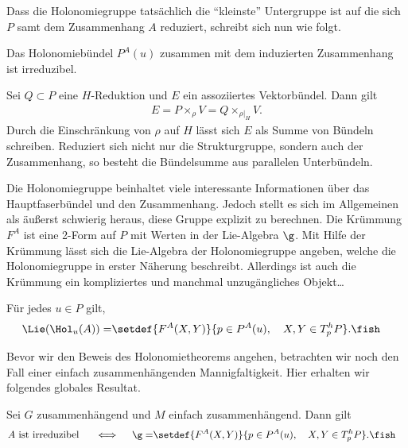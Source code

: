 \documentclass[%
	paper=a5,%
	fleqn,%
	DIV=18,%
	BCOR=0mm,
	fontsize=11pt,
	titlepage=false,%
	bibliography=totoc,
	DIV=18,%
	twoside=true,
	pdftitle=Riemannsche Geometrie,
	pdfauthor=Uwe Semmelmann,
	numbers=noendperiod]%
	{scrbook}
\begin{document}
Dass die Holonomiegruppe tatsächlich die ``kleinste'' Untergruppe ist auf die sich $P$ samt dem Zusammenhang $A$ reduziert, schreibt sich nun wie folgt.

\begin{prop}
Das Holonomiebündel $P^A(u)$ zusammen mit dem induzierten Zusammenhang ist irreduzibel.\fish
\end{prop}


\begin{rem}
Sei $Q\subset P$ eine $H$-Reduktion und $E$ ein assoziiertes Vektorbündel. Dann gilt
\begin{align*}
E = P\times_{\rho} V = Q\times_{\rho\big|_{H}}V.
\end{align*}
Durch die Einschränkung von $\rho$ auf $H$ lässt sich $E$ als Summe von Bündeln schreiben. Reduziert sich nicht nur die Strukturgruppe, sondern auch der Zusammenhang, so besteht die Bündelsumme aus parallelen Unterbündeln.\map
\end{rem}

Die Holonomiegruppe beinhaltet viele interessante Informationen über das Hauptfaserbündel und den Zusammenhang. Jedoch stellt es sich im Allgemeinen als äußerst schwierig heraus, diese Gruppe explizit zu berechnen. Die Krümmung $F^A$ ist eine 2-Form auf $P$ mit Werten in der Lie-Algebra $\g$. Mit Hilfe der Krümmung lässt sich die Lie-Algebra der Holonomiegruppe angeben, welche die Holonomiegruppe in erster Näherung beschreibt. Allerdings ist auch die Krümmung ein kompliziertes und manchmal unzugängliches Objekt\ldots

\begin{prop}
Für jedes $u\in P$ gilt,
\begin{align*}
\Lie(\Hol_{u}(A)) = \span\setdef{F^A(X,Y)}{p\in P^A(u),\quad X,Y\in T_{p}^hP}.\fish
\end{align*}
\end{prop}

Bevor wir den Beweis des Holonomietheorems angehen, betrachten wir noch den Fall einer einfach zusammenhängenden Mannigfaltigkeit. 
Hier erhalten wir folgendes globales Resultat.

\begin{cor}
Sei $G$ zusammenhängend und $M$ einfach zusammenhängend. Dann gilt
\begin{align*}
A\text{ ist irreduzibel } \quad\iff\quad \g = \span\setdef{F^A(X,Y)}{p\in P^A(u),\quad X,Y\in T_{p}^hP}.\fish
\end{align*}
\end{cor}
\end{document}
